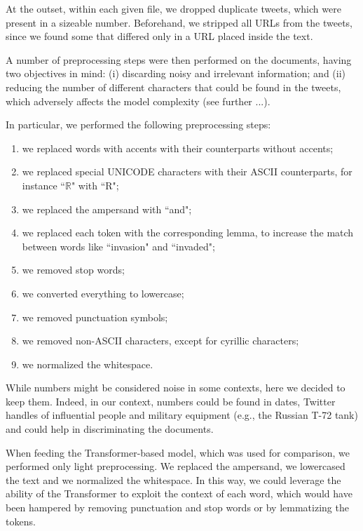 \documentclass[runningheads]{llncs}
\begin{document}
At the outset, within each given file, we dropped duplicate tweets, which were present in a sizeable number. Beforehand, we stripped all URLs from the tweets, since we found some that differed only in a URL placed inside the text.  

A number of preprocessing steps were then performed on the documents, having two objectives in mind: (i) discarding noisy and irrelevant information; and (ii) reducing the number of different characters that could be found in the tweets, which adversely affects the model complexity (see further ...). 

In particular, we performed the following preprocessing steps:

\begin{enumerate}
    \item we replaced words with accents with their counterparts without accents;
    \item we replaced special UNICODE characters with their ASCII counterparts, for instance “$\mathbb{R}$" with “R";
    \item we replaced the ampersand with “and";
    \item we replaced each token with the corresponding lemma, to increase the match between words like “invasion" and “invaded";
    \item we removed stop words;
    \item we converted everything to lowercase;
    \item we removed punctuation symbols;
    \item we removed non-ASCII characters, except for cyrillic characters;
    \item we normalized the whitespace.
\end{enumerate}

While numbers might be considered noise in some contexts, here we decided to keep them. Indeed, in our context, numbers could be found in dates, Twitter handles of influential people and military equipment (e.g., the Russian T-72 tank) and could help in discriminating the documents.

When feeding the Transformer-based model, which was used for comparison, we performed only light preprocessing. We replaced the ampersand, we lowercased the text and we normalized the whitespace. In this way, we could leverage the ability of the Transformer to exploit the context of each word, which would have been hampered by removing punctuation and stop words or by lemmatizing the tokens.
\end{document}
